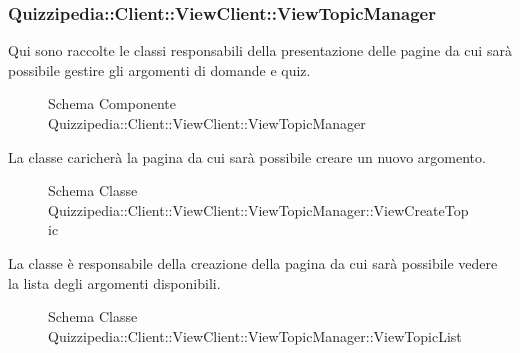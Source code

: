 \subsubsection{Quizzipedia::Client::ViewClient::ViewTopicManager}
Qui sono raccolte le classi responsabili della presentazione delle pagine da cui sarà possibile gestire gli argomenti di domande e quiz.
\begin{figure}[H]
\centering
\noindent{}
\caption{Schema Componente Quizzipedia::Client::ViewClient::ViewTopicManager}
\end{figure}
La classe caricherà la pagina da cui sarà possibile creare un nuovo argomento.
\begin{figure}[H]
\centering
\noindent{}
\caption{Schema Classe Quizzipedia::Client::ViewClient::ViewTopicManager::ViewCreateTopic}
\end{figure}
La classe è responsabile della creazione della pagina da cui sarà possibile vedere la lista degli argomenti disponibili.
\begin{figure}[H]
\centering
\noindent{}
\caption{Schema Classe Quizzipedia::Client::ViewClient::ViewTopicManager::ViewTopicList}
\end{figure}
